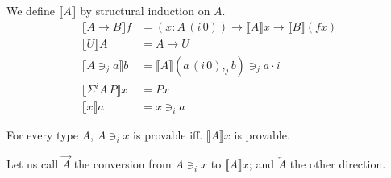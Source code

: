 \documentclass[english]{PaperTools/latex/lipics}
\newcommand\CP[3]{(#2,_{#1} #3)}
\newcommand\param[1]{\!\cdot\!#1}
\newcommand\op[1]{∋_{#1}}
\newcommand\ip[3]{Σ^{#1} {#2}\,{#3}}
\newcommand\mor[2]{{#1}\,{#2}}
\newcommand\proj[2]{\mor{#2}{(#1\,0)}}
\begin{document}
\begin{definition}
We define $⟦A⟧$ by structural induction on $A$.
  \begin{align*}
    ⟦A → B⟧ f & = (x:\proj i A) → ⟦A⟧ x → ⟦B⟧ (f x)\\
    ⟦U⟧ A & = A → U\\
    ⟦A \op j a ⟧ b &= ⟦A⟧ \CP j {\proj i a} b \op j a \param i \\
    ⟦\ip i A P⟧ x & = P x\\
    ⟦x⟧ a & = x \op i a
  \end{align*}
\end{definition}

\providecommand\TO{\overrightarrow}
\providecommand\FROM{\overleftarrow}

\begin{theorem}
For every type $A$, $A \op i x$ is provable iff. $⟦A⟧ x$ is provable.
\end{theorem}
Let us call $\TO A$ the conversion from $A \op i x$ to $⟦A⟧ x$; and $\FROM A$ the other direction.
\end{document}
